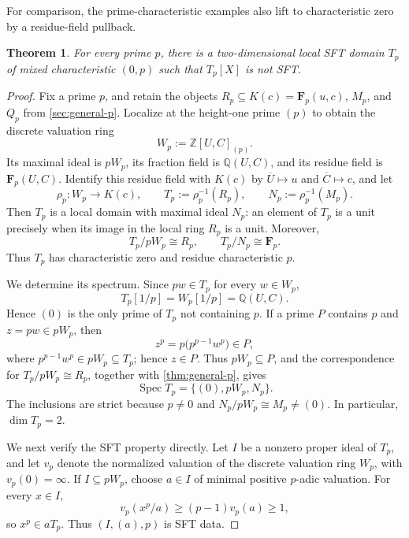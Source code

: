\documentclass[11pt,reqno]{amsart}
\numberwithin{equation}{section}
\theoremstyle{plain}
\newtheorem{theorem}{Theorem}[section]
\theoremstyle{definition}
\theoremstyle{remark}
\newcommand{\F}{\mathbf F}
\newcommand{\Spec}{\operatorname{Spec}}
\begin{document}
For comparison, the prime-characteristic examples also lift to characteristic
zero by a residue-field pullback.

\begin{theorem}\label{thm:mixed-characteristic}
For every prime $p$, there is a two-dimensional local SFT domain $T_p$ of
mixed characteristic $(0,p)$ such that $T_p[X]$ is not SFT.
\end{theorem}

\begin{proof}
Fix a prime $p$, and retain the objects
$R_p\subseteq K(c)=\F_p(u,c)$, $M_p$, and $Q_p$ from
\cref{sec:general-p}.  Localize at the height-one prime $(p)$ to obtain the
discrete valuation ring
\[
  W_p:=\mathbb Z[U,C]_{(p)}.
\]
Its maximal ideal is $pW_p$, its fraction field is $\mathbb Q(U,C)$, and its
residue field is $\F_p(U,C)$.  Identify this residue field with $K(c)$ by
$\overline U\mapsto u$ and $\overline C\mapsto c$, and let
\begin{equation}\label{eq:mixed-pullback}
  \rho_p:W_p\longrightarrow K(c),\qquad
  T_p:=\rho_p^{-1}(R_p),\qquad N_p:=\rho_p^{-1}(M_p).
\end{equation}
Then $T_p$ is a local domain with maximal ideal $N_p$: an element of $T_p$
is a unit precisely when its image in the local ring $R_p$ is a unit.
Moreover,
\[
  T_p/pW_p\cong R_p,\qquad T_p/N_p\cong\F_p.
\]
Thus $T_p$ has characteristic zero and residue characteristic $p$.

We determine its spectrum.  Since $pw\in T_p$ for every
$w\in W_p$,
\[
  T_p[1/p]=W_p[1/p]=\mathbb Q(U,C).
\]
Hence $(0)$ is the only prime of $T_p$ not containing $p$.  If a prime $P$
contains $p$ and $z=pw\in pW_p$, then
\[
  z^p=p\bigl(p^{p-1}w^p\bigr)\in P,
\]
where $p^{p-1}w^p\in pW_p\subseteq T_p$; hence $z\in P$.  Thus
$pW_p\subseteq P$, and the correspondence for $T_p/pW_p\cong R_p$,
together with \cref{thm:general-p}, gives
\[
  \Spec T_p=\{(0),pW_p,N_p\}.
\]
The inclusions are strict because $p\neq0$ and
$N_p/pW_p\cong M_p\neq(0)$.  In particular, $\dim T_p=2$.

We next verify the SFT property directly.  Let $I$ be a nonzero proper ideal
of $T_p$, and let $v_p$ denote the normalized valuation of the discrete
valuation ring $W_p$, with $v_p(0)=\infty$.  If $I\subseteq pW_p$, choose
$a\in I$ of minimal positive $p$-adic valuation.  For every $x\in I$,
\[
  v_p(x^p/a)\geq(p-1)v_p(a)\geq1,
\]
so $x^p\in aT_p$.  Thus $(I,(a),p)$ is SFT data.


\end{proof}
\end{document}
